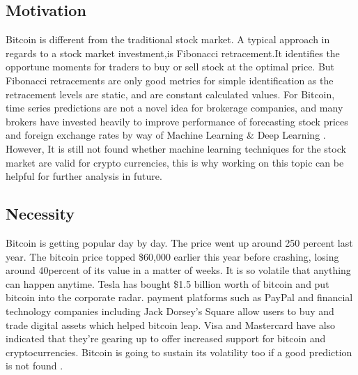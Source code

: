 \documentclass{IEEEtran}
\begin{document}
\subsection{Motivation}
Bitcoin is different from the traditional stock market. A typical approach in regards to a stock market investment,is Fibonacci retracement.It identifies the opportune moments for traders to buy or sell stock at the optimal price. But Fibonacci retracements are only good metrics for simple identification as the retracement levels are static, and are constant calculated values. For Bitcoin, time series predictions are not a novel idea for brokerage companies, and many brokers have invested heavily to improve performance of forecasting stock prices and foreign exchange rates by way of Machine Learning & Deep Learning \cite{Fahmi2018}. However, It is still not found whether machine learning techniques for the stock market are valid for crypto currencies, this is why working on this topic can be helpful for further analysis in future.
\subsection{Necessity}
Bitcoin is getting popular day by day. The price went up around 250 percent last year. The bitcoin price topped \$60,000 earlier this year before crashing, losing around 40percent of its value in a matter of weeks. It is so volatile that anything can happen anytime. Tesla has bought \$1.5 billion worth of bitcoin and put bitcoin into the corporate radar. payment platforms such as PayPal  and financial technology companies including Jack Dorsey's Square allow users to buy and trade digital assets which helped bitcoin leap. Visa and Mastercard have also indicated  that they're gearing up to offer increased support for bitcoin and cryptocurrencies. Bitcoin is going to sustain its volatility too if a good prediction is not found \cite{Cc}.

\clearpage
\end{document}

